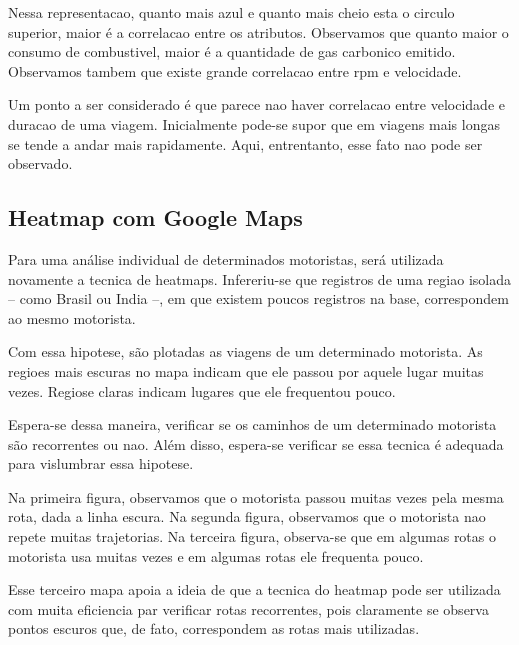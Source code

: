 \documentclass[10pt, conference]{IEEEtran}
\begin{document}
Nessa representacao, quanto mais azul e quanto mais cheio esta o circulo superior, maior
é a correlacao entre os atributos. Observamos que quanto maior o consumo de combustivel,
maior é a quantidade de gas carbonico emitido. Observamos tambem que existe grande
correlacao entre rpm e velocidade. 

Um ponto a ser considerado é que parece nao haver correlacao entre velocidade e duracao
de uma viagem. Inicialmente pode-se supor que em viagens mais longas se tende a andar
mais rapidamente. Aqui, entrentanto, esse fato nao pode ser observado.



\subsection{Heatmap com Google Maps}

Para uma análise individual de determinados motoristas, será utilizada novamente a tecnica de heatmaps.
Infereriu-se que registros de uma regiao isolada -- como Brasil ou India --, em que existem poucos
registros na base, correspondem ao mesmo motorista.

Com essa hipotese, são plotadas as viagens de um determinado motorista. As regioes mais escuras no
mapa indicam que ele passou por aquele lugar muitas vezes. Regiose claras indicam lugares que ele
frequentou pouco. 

Espera-se dessa maneira, verificar se os caminhos de um determinado motorista são recorrentes ou nao.
Além disso, espera-se verificar se essa tecnica é adequada para vislumbrar essa hipotese.

Na primeira figura, observamos que o motorista passou muitas vezes pela mesma rota, dada a linha escura.
Na segunda figura, observamos que o motorista nao repete muitas trajetorias. Na terceira figura, observa-se
que em algumas rotas o motorista usa muitas vezes e em algumas rotas ele frequenta pouco.

Esse terceiro mapa apoia a ideia de que a tecnica do heatmap pode ser utilizada com muita eficiencia par
verificar rotas recorrentes, pois claramente se observa pontos escuros que, de fato, correspondem as 
rotas mais utilizadas.


\end{document}

